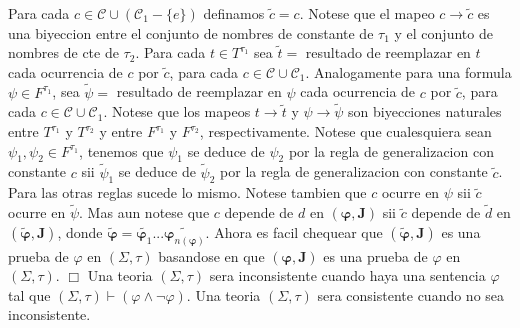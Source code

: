 Para cada \(c\in \mathcal{C}\cup (\mathcal{C}_{1}-\{e\})\) definamos \(\tilde{c} =c\). Notese que el mapeo \(c\rightarrow \tilde{c}\) es una biyeccion entre el conjunto de nombres de constante de \(\tau _{1}\) y el conjunto de nombres de cte de \(\tau _{2}\). Para cada \(t\in T^{\tau _{1}}\) sea \(\tilde{t}=\) resultado de reemplazar en \(t\) cada ocurrencia de \(c\) por \(\tilde{c}\), para cada \(c\in \mathcal{C}\cup \mathcal{C}_{1}\). Analogamente para una formula \( \psi \in F^{\tau _{1}}\), sea \(\tilde{\psi}=\) resultado de reemplazar en \( \psi \) cada ocurrencia de \(c\) por \(\tilde{c}\), para cada \(c\in \mathcal{C} \cup \mathcal{C}_{1}\). Notese que los mapeos \(t\rightarrow \tilde{t}\) y \( \psi \rightarrow \tilde{\psi}\) son biyecciones naturales entre \(T^{\tau _{1}} \) y \(T^{\tau _{2}}\) y entre \(F^{\tau _{1}}\) y \(F^{\tau _{2}}\), respectivamente. Notese que cualesquiera sean \(\psi _{1},\psi _{2}\in F^{\tau _{1}}\), tenemos que \(\psi _{1}\) se deduce de \(\psi _{2}\) por la regla de generalizacion con constante \(c\) sii \(\tilde{\psi}_{1}\) se deduce de \(\tilde{\psi}_{2}\) por la regla de generalizacion con constante \(\tilde{c} \). Para las otras reglas sucede lo mismo. Notese tambien que \(c\) ocurre en \( \psi \) sii \(\tilde{c}\) ocurre en \(\tilde{\psi}.\) Mas aun notese que \(c\) depende de \(d\) en \((\mathbf{\varphi },\mathbf{J})\) sii \(\tilde{c}\) depende de \(\tilde{d}\) en \((\mathbf{\tilde{\varphi}},\mathbf{J})\), donde \(\mathbf{ \tilde{\varphi}}=\widetilde{\mathbf{\varphi }_{1}}...\widetilde{\mathbf{ \varphi }_{n(\mathbf{\varphi })}}\). Ahora es facil chequear que \((\mathbf{ \tilde{\varphi}},\mathbf{J})\) es una prueba de \(\varphi \) en \((\Sigma ,\tau ) \) basandose en que \((\mathbf{\varphi },\mathbf{J})\) es una prueba de \( \varphi \) en \((\Sigma ,\tau )\). \(\Box\)
Una teoria \((\Sigma ,\tau )\) sera inconsistente cuando haya una sentencia \(\varphi \) tal que \((\Sigma ,\tau )\vdash (\varphi \wedge \lnot \varphi ).\) Una teoria \((\Sigma ,\tau )\) sera consistente cuando no sea inconsistente.

